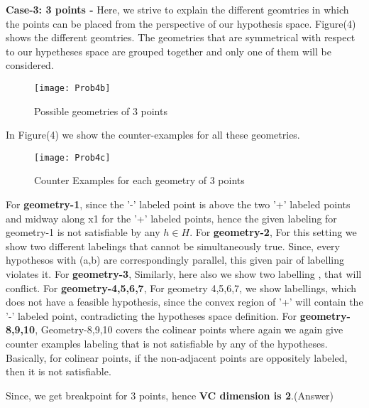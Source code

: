 \documentclass{article}
\begin{document}
   \textbf {Case-3: 3 points -} Here, we strive to explain the different geomtries in which the points can be placed from the perspective of our hypothesis space. Figure(4) shows the different geomtries. The geometries that are symmetrical with respect to our hypetheses space are grouped together and only one of them will be considered. \newline
  \begin{figure}[h!]
   \centering
  \texttt{[image: Prob4b]}
  \caption{Possible geometries of 3 points}
  \end{figure}

  In Figure(4) we show the counter-examples for all these geometries. \newline
  \begin{figure}[h!]
   \centering
  \texttt{[image: Prob4c]}
  \caption{Counter Examples for each geometry of 3 points}
  \end{figure}
  For \textbf {geometry-1}, since the '-' labeled point is above the two '+' labeled points and midway along x1 for the '+' labeled points, hence the given labeling for geometry-1 is not satisfiable by any $h \in H$. \newline
  For \textbf {geometry-2}, For this setting we show two different labelings that cannot be simultaneously true. Since, every hypothesos with (a,b) are correspondingly parallel, this given pair of labelling violates it. \newline
  For \textbf {geometry-3}, Similarly, here also we show two labelling , that will conflict. \newline
  For \textbf {geometry-4,5,6,7}, For geometry 4,5,6,7, we show labellings, which does not have a feasible hypothesis, since the convex region of '+' will contain the '-' labeled point, contradicting the hypotheses space definition. \newline
  For \textbf {geometry-8,9,10}, Geometry-8,9,10 covers the colinear points where again we again give counter examples labeling that is not satisfiable by any of the hypotheses. Basically, for colinear points, if the non-adjacent points are oppositely labeled, then it is not satisfiable. \newline

  Since, we get breakpoint for 3 points, hence \textbf {VC dimension is 2}.(Answer)\newline
\end{document}
